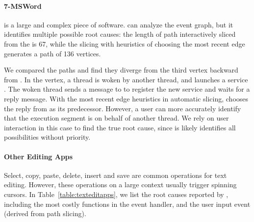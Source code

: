 \paragraph{7-MSWord}

 is a large and complex piece of software. \xxx can analyze
the event graph, but it identifies multiple possible root causes: the length of
path interactively sliced from the \spinningnode is 67, while the slicing with
heuristics of choosing the most recent edge generates a path of 136 vertices.

We compared the paths and find they diverge from the third vertex backward
from \spinningnode. In the vertex, a  thread is
woken by another  thread, and launches a service
. The woken thread sends a message
to  to register the new service and waits for a reply message.
With the most recent edge heuristics in automatic slicing, \xxx chooses the
reply from  as its predecessor. However, a user can more accurately
identify that the execution segment is on behalf of another 
thread. We rely on user interaction in this case to find the true root cause,
since \xxx is likely identifies all possibilities without priority.

\paragraph{Other Editing Apps}

Select, copy, paste, delete, insert and save are common operations for text
editing. However, these operations on a large context usually trigger spinning
cursors. In Table~\ref{table:texteditapps}, we list the root causes reported by
\xxx, including the most costly functions in the event handler, and the user
input event (derived from path slicing).

